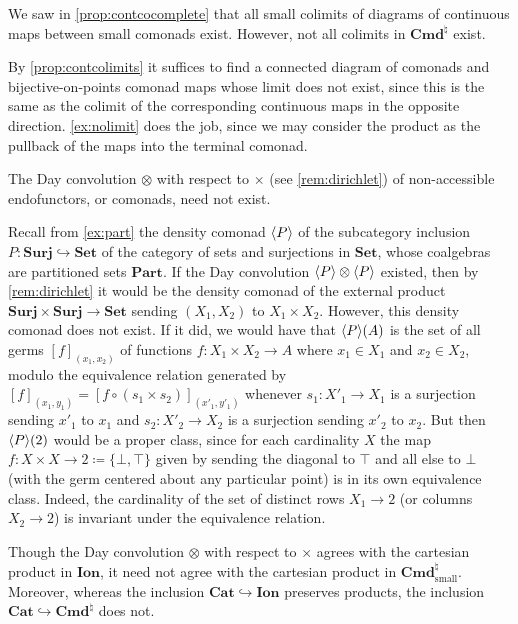 \documentclass[11pt, oneside, article]{memoir}
\theoremstyle{plain}
\theoremstyle{definition}
\theoremstyle{remark}
\newenvironment{counterexample}
{\renewcommand\qedsymbol{$\lrcorner$}%
  \pushQED{\qed}\mycounterexample}
{\popQED\endmycounterexample}
\DeclarePairedDelimiter{\gen}{\langle}{\rangle}
\newcommand{\namedcat}[1]{\mathbf{#1}}
\newcommand{\Set}{\namedcat{Set}}
\newcommand{\Cat}{\namedcat{Cat}}
\newcommand{\Part}{\namedcat{Part}}
\newcommand{\Surj}{\namedcat{Surj}}
\newcommand{\Con}{\namedcat{Cmd}^\natural}
\newcommand{\ConSet}{\Con}
\newcommand{\ConO}{\Con}
\newcommand{\ConOSet}{\ConO}
\newcommand{\ph}[1]{#1}
\newcommand{\Ionad}{\namedcat{Ion}}
\newcommand{\AccCon}{\Con_{\mathrm{small}}}
\newcommand{\AccConSet}{\AccCon}
\newcommand{\setof}[1]{\{#1\}}
\newcommand{\xA}{A}
\newcommand{\xX}{X}
\newcommand{\pP}{\ph{P}}
\newcommand{\cP}{\gen{\pP}}
\begin{document}
We saw in \cref{prop:contcocomplete} that all small colimits of
diagrams of continuous maps between small comonads exist. However, not
all colimits in $\ConOSet$ exist.

\begin{counterexample}[Continuous non-colimit]\label{ex:nocolimit}
  By \cref{prop:contcolimits} it suffices to find a connected diagram
  of comonads and bijective-on-points comonad maps whose limit does
  not exist, since this is the same as the colimit of the
  corresponding continuous maps in the opposite
  direction. \cref{ex:nolimit} does the job, since we may consider the
  product as the pullback of the maps into the terminal comonad.
\end{counterexample}

The Day convolution $\otimes$ with respect to $\times$ (see \cref{rem:dirichlet}) of
non-accessible endofunctors, or comonads, need not exist.

\begin{counterexample}[Non-product]
  Recall from \cref{ex:part} the density comonad $\cP$ of the
  subcategory inclusion $\pP \colon \Surj \hookrightarrow \Set$ of the
  category of sets and surjections in $\Set$, whose coalgebras are
  partitioned sets $\Part$. If the Day convolution $\cP \otimes \cP$
  existed, then by \cref{rem:dirichlet} it would be the density
  comonad of the external product $\Surj \times \Surj \to \Set$
  sending $(\xX_1, \xX_2)$ to $\xX_1 \times \xX_2$. However, this
  density comonad does not exist. If it did, we would have that
  $\cP(\xA)$ is the set of all germs $[f]_{(x_1,x_2)}$ of functions
  $f \colon \xX_1 \times \xX_2 \to \xA$ where $x_1 \in \xX_1$ and
  $x_2 \in \xX_2$, modulo the equivalence relation generated by
  $[f]_{(x_1,y_1)} = [f \circ (s_1 \times s_2)]_{(x'_1,y'_1)}$
  whenever $s_1 \colon \xX'_1 \to \xX_1$ is a surjection sending
  $x'_1 $ to $x_1$ and $s_2 \colon \xX'_2 \to \xX_2$ is a surjection
  sending $x'_2$ to $x_2$. But then $\cP(2)$ would be a proper class,
  since for each cardinality $\xX$ the map
  $f \colon \xX \times \xX \to 2 \coloneqq \setof{\bot, \top}$ given
  by sending the diagonal to $\top$ and all else to $\bot$ (with the
  germ centered about any particular point) is in its own equivalence
  class. Indeed, the cardinality of the set of distinct rows
  $\xX_1 \to 2$ (or columns $\xX_2 \to 2$) is invariant under the
  equivalence relation.
\end{counterexample}

Though the Day convolution $\otimes$ with respect to $\times$ agrees
with the cartesian product in $\Ionad$, it need not agree with the
cartesian product in $\AccConSet$.  Moreover, whereas the inclusion
$\Cat \hookrightarrow \Ionad$ preserves products, the inclusion
$\Cat \hookrightarrow \ConSet$ does not.
\end{document}
